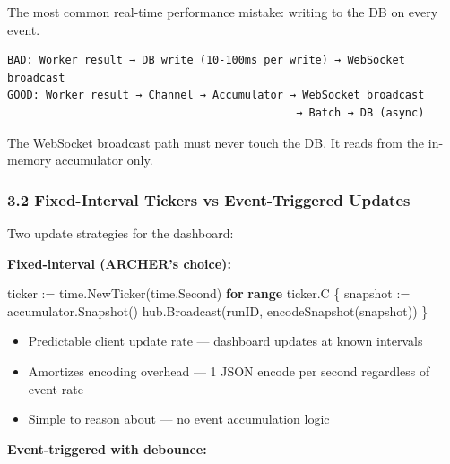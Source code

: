 \documentclass[
]{article}
\newenvironment{Shaded}{}{}
\newcommand{\ControlFlowTok}[1]{\textcolor[rgb]{0.00,0.44,0.13}{\textbf{#1}}}
\newcommand{\KeywordTok}[1]{\textcolor[rgb]{0.00,0.44,0.13}{\textbf{#1}}}
\newcommand{\NormalTok}[1]{#1}
\newcommand{\OperatorTok}[1]{\textcolor[rgb]{0.40,0.40,0.40}{#1}}
\providecommand{\tightlist}{%
  \setlength{\itemsep}{0pt}\setlength{\parskip}{0pt}}
\begin{document}
The most common real-time performance mistake: writing to the DB on
every event.

\begin{verbatim}
BAD: Worker result → DB write (10-100ms per write) → WebSocket broadcast
GOOD: Worker result → Channel → Accumulator → WebSocket broadcast
                                             → Batch → DB (async)
\end{verbatim}

The WebSocket broadcast path must never touch the DB. It reads from the
in-memory accumulator only.

\hypertarget{fixed-interval-tickers-vs-event-triggered-updates}{%
\subsubsection{3.2 Fixed-Interval Tickers vs Event-Triggered
Updates}\label{fixed-interval-tickers-vs-event-triggered-updates}}

Two update strategies for the dashboard:

\textbf{Fixed-interval (ARCHER's choice):}

\begin{Shaded}
\begin{Highlighting}[]
\NormalTok{ticker }\OperatorTok{:=}\NormalTok{ time}\OperatorTok{.}\NormalTok{NewTicker}\OperatorTok{(}\NormalTok{time}\OperatorTok{.}\NormalTok{Second}\OperatorTok{)}
\ControlFlowTok{for} \KeywordTok{range}\NormalTok{ ticker}\OperatorTok{.}\NormalTok{C }\OperatorTok{\{}
\NormalTok{    snapshot }\OperatorTok{:=}\NormalTok{ accumulator}\OperatorTok{.}\NormalTok{Snapshot}\OperatorTok{()}
\NormalTok{    hub}\OperatorTok{.}\NormalTok{Broadcast}\OperatorTok{(}\NormalTok{runID}\OperatorTok{,}\NormalTok{ encodeSnapshot}\OperatorTok{(}\NormalTok{snapshot}\OperatorTok{))}
\OperatorTok{\}}
\end{Highlighting}
\end{Shaded}

\begin{itemize}
\tightlist
\item
  Predictable client update rate --- dashboard updates at known
  intervals
\item
  Amortizes encoding overhead --- 1 JSON encode per second regardless of
  event rate
\item
  Simple to reason about --- no event accumulation logic
\end{itemize}

\textbf{Event-triggered with debounce:}
\end{document}
